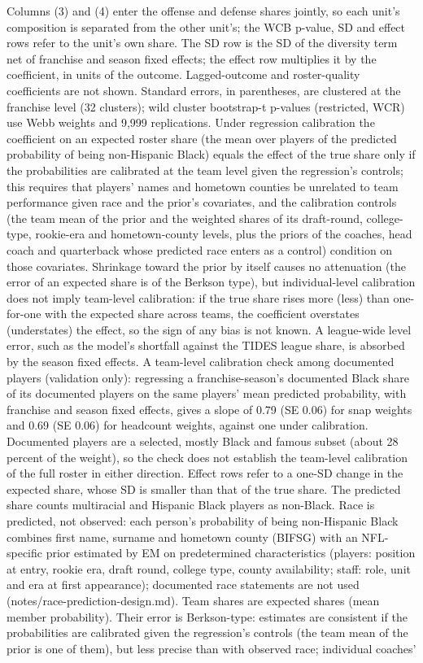 \begin{table}[!h]
{\begin{threeparttable}
\begin{tablenotes}[para]
Columns (3) and (4) enter the offense and defense shares jointly, so each unit's composition is separated from the other unit's; the WCB p-value, SD and effect rows refer to the unit's own share. The SD row is the SD of the diversity term net of franchise and season fixed effects; the effect row multiplies it by the coefficient, in units of the outcome. Lagged-outcome and roster-quality coefficients are not shown. Standard errors, in parentheses, are clustered at the franchise level (32 clusters); wild cluster bootstrap-t p-values (restricted, WCR) use Webb weights and 9,999 replications. Under regression calibration the coefficient on an expected roster share (the mean over players of the predicted probability of being non-Hispanic Black) equals the effect of the true share only if the probabilities are calibrated at the team level given the regression's controls; this requires that players' names and hometown counties be unrelated to team performance given race and the prior's covariates, and the calibration controls (the team mean of the prior and the weighted shares of its draft-round, college-type, rookie-era and hometown-county levels, plus the priors of the coaches, head coach and quarterback whose predicted race enters as a control) condition on those covariates. Shrinkage toward the prior by itself causes no attenuation (the error of an expected share is of the Berkson type), but individual-level calibration does not imply team-level calibration: if the true share rises more (less) than one-for-one with the expected share across teams, the coefficient overstates (understates) the effect, so the sign of any bias is not known. A league-wide level error, such as the model's shortfall against the TIDES league share, is absorbed by the season fixed effects. A team-level calibration check among documented players (validation only): regressing a franchise-season's documented Black share of its documented players on the same players' mean predicted probability, with franchise and season fixed effects, gives a slope of 0.79 (SE 0.06) for snap weights and  0.69 (SE 0.06) for headcount weights, against one under calibration. Documented players are a selected, mostly Black and famous subset (about 28 percent of the weight), so the check does not establish the team-level calibration of the full roster in either direction. Effect rows refer to a one-SD change in the expected share, whose SD is smaller than that of the true share. The predicted share counts multiracial and Hispanic Black players as non-Black. Race is predicted, not observed: each person's probability of being non-Hispanic Black combines first name, surname and hometown county (BIFSG) with an NFL-specific prior estimated by EM on predetermined characteristics (players: position at entry, rookie era, draft round, college type, county availability; staff: role, unit and era at first appearance); documented race statements are not used (notes/race-prediction-design.md). Team shares are expected shares (mean member probability). Their error is Berkson-type: estimates are consistent if the probabilities are calibrated given the regression's controls (the team mean of the prior is one of them), but less precise than with observed race; individual coaches' 
\end{tablenotes}
\end{threeparttable}}
\end{table}
